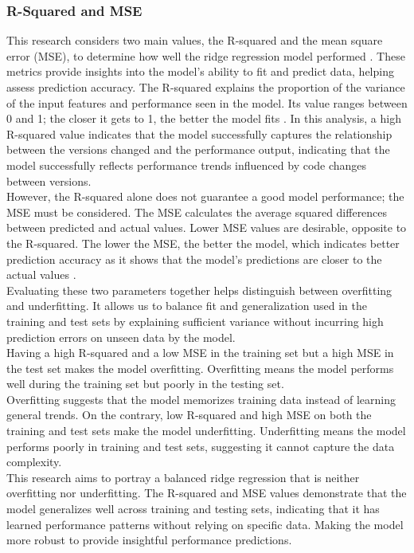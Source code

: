 \subsubsection{R-Squared and MSE}
This research considers two main values, the R-squared and the mean square error (\ac{MSE}), to determine how well the ridge regression model performed \cite{mcdonald2009ridgeregression, chicco2021coefficientofdetermination, wang2009meansquareerror}. These metrics provide insights into the model’s ability to fit and predict data, helping assess prediction accuracy. The R-squared explains the proportion of the variance of the input features and performance seen in the model. Its value ranges between 0 and 1; the closer it gets to 1, the better the model fits \cite{chicco2021coefficientofdetermination}. In this analysis, a high R-squared value indicates that the model successfully captures the relationship between the versions changed and the performance output, indicating that the model successfully reflects performance trends influenced by code changes between versions. \\
However, the R-squared alone does not guarantee a good model performance; the \ac{MSE} must be considered. The \ac{MSE} calculates the average squared differences between predicted and actual values. Lower \ac{MSE} values are desirable, opposite to the R-squared. The lower the \ac{MSE}, the better the model, which indicates better prediction accuracy as it shows that the model’s predictions are closer to the actual values \cite{wang2009meansquareerror}. \\
Evaluating these two parameters together helps distinguish between overfitting and underfitting. It allows us to balance fit and generalization used in the training and test sets by explaining sufficient variance without incurring high prediction errors on unseen data by the model.  \\
Having a high R-squared and a low \ac{MSE} in the training set but a high \ac{MSE} in the test set makes the model overfitting. Overfitting means the model performs well during the training set but poorly in the testing set. \\
Overfitting suggests that the model memorizes training data instead of learning general trends. On the contrary, low R-squared and high \ac{MSE} on both the training and test sets make the model underfitting. Underfitting means the model performs poorly in training and test sets, suggesting it cannot capture the data complexity. \\
This research aims to portray a balanced ridge regression that is neither overfitting nor underfitting. The R-squared and \ac{MSE} values demonstrate that the model generalizes well across training and testing sets, indicating that it has learned performance patterns without relying on specific data. Making the model more robust to provide insightful performance predictions.


